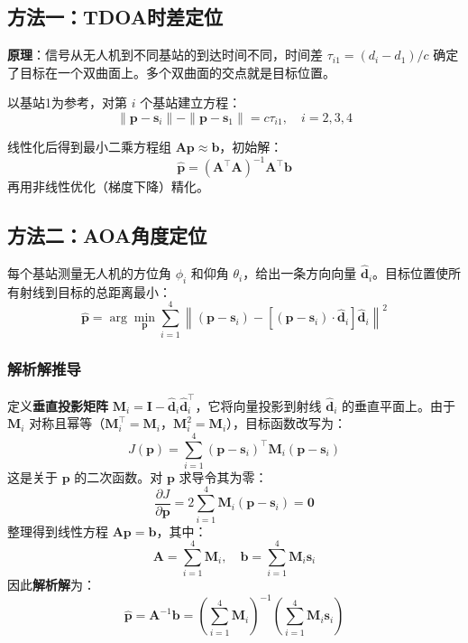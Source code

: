 \documentclass[12pt, a4paper]{article}
\newcommand{\mat}[1]{\boldsymbol{#1}}
\begin{document}
\subsection{方法一：TDOA时差定位}

\textbf{原理}：信号从无人机到不同基站的到达时间不同，时间差 $\tau_{i1} = (d_i - d_1)/c$ 确定了目标在一个双曲面上。多个双曲面的交点就是目标位置。

以基站1为参考，对第 $i$ 个基站建立方程：
\begin{equation}
\|\mat{p} - \mat{s}_i\| - \|\mat{p} - \mat{s}_1\| = c\tau_{i1}, \quad i = 2,3,4
\end{equation}

线性化后得到最小二乘方程组 $\mat{A}\mat{p} \approx \mat{b}$，初始解：
\begin{equation}
\hat{\mat{p}} = (\mat{A}^\top\mat{A})^{-1}\mat{A}^\top\mat{b}
\end{equation}
再用非线性优化（梯度下降）精化。

\subsection{方法二：AOA角度定位}

每个基站测量无人机的方位角 $\phi_i$ 和仰角 $\theta_i$，给出一条方向向量 $\hat{\mat{d}}_i$。目标位置使所有射线到目标的总距离最小：
\begin{equation}
\hat{\mat{p}} = \arg\min_{\mat{p}} \sum_{i=1}^{4} \left\|(\mat{p} - \mat{s}_i) - \left[(\mat{p}-\mat{s}_i)\cdot\hat{\mat{d}}_i\right]\hat{\mat{d}}_i\right\|^2
\end{equation}

\subsubsection{解析解推导}

定义\textbf{垂直投影矩阵} $\mat{M}_i = \mat{I} - \hat{\mat{d}}_i\hat{\mat{d}}_i^\top$，它将向量投影到射线 $\hat{\mat{d}}_i$ 的垂直平面上。由于 $\mat{M}_i$ 对称且幂等（$\mat{M}_i^\top = \mat{M}_i$，$\mat{M}_i^2 = \mat{M}_i$），目标函数改写为：
\begin{equation}
J(\mat{p}) = \sum_{i=1}^{4} (\mat{p} - \mat{s}_i)^\top \mat{M}_i (\mat{p} - \mat{s}_i)
\end{equation}
这是关于 $\mat{p}$ 的二次函数。对 $\mat{p}$ 求导令其为零：
\[
\frac{\partial J}{\partial \mat{p}} = 2\sum_{i=1}^{4} \mat{M}_i(\mat{p} - \mat{s}_i) = \mat{0}
\]
整理得到线性方程 $\mat{A}\mat{p} = \mat{b}$，其中：
\begin{equation}
\mat{A} = \sum_{i=1}^{4}\mat{M}_i, \quad \mat{b} = \sum_{i=1}^{4}\mat{M}_i\mat{s}_i
\end{equation}
因此\textbf{解析解}为：
\begin{equation}
\boxed{\hat{\mat{p}} = \mat{A}^{-1}\mat{b} = \left(\sum_{i=1}^{4}\mat{M}_i\right)^{-1}\left(\sum_{i=1}^{4}\mat{M}_i\mat{s}_i\right)}
\end{equation}
\end{document}
